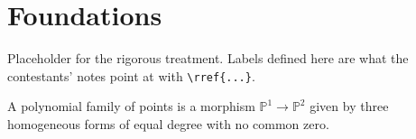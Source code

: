 \section{Foundations}\label{sec:foundations}

Placeholder for the rigorous treatment. Labels defined here are what the
contestants' notes point at with \verb|\rref{...}|.

\begin{defn}\label{def:polynomial-family}
  A polynomial family of points is a morphism $\mathbb{P}^1 \to \mathbb{P}^2$
  given by three homogeneous forms of equal degree with no common zero.
\end{defn}
